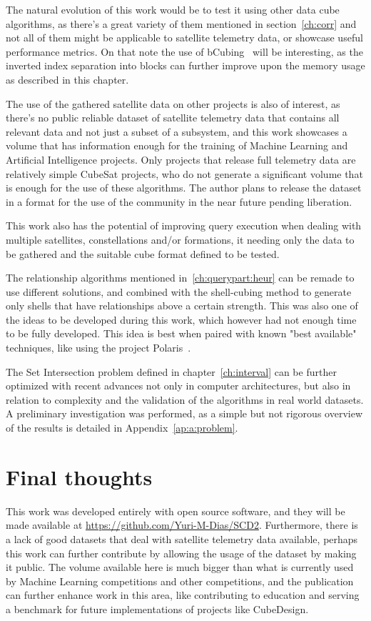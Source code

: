 The natural evolution of this work would be to test it using other data cube algorithms, as there's a great variety of them mentioned in section~\ref{ch:corr} and not all of them might be applicable to satellite telemetry data, or showcase useful performance metrics.
On that note the use of bCubing~\cite{silva:2015:abordagensParaCubo} will be interesting, as the inverted index separation into blocks can further improve upon the memory usage as described in this chapter.

The use of the gathered satellite data on other projects is also of interest, as there's no public reliable dataset of satellite telemetry data that contains all relevant data and not just a subset of a subsystem, and this work showcases a volume that has information enough for the training of Machine Learning and Artificial Intelligence projects.
Only projects that release full telemetry data are relatively simple CubeSat projects, who do not generate a significant volume that is enough for the use of these algorithms.
The author plans to release the dataset in a format for the use of the community in the near future pending liberation.

This work also has the potential of improving query execution when dealing with multiple satellites, constellations and/or formations, it needing only the data to be gathered and the suitable cube format defined to be tested.

The relationship algorithms mentioned in~\autoref{ch:querypart:heur} can be remade to use different solutions, and combined with the shell-cubing method to generate only shells that have relationships above a certain strength.
This was also one of the ideas to be developed during this work, which however had not enough time to be fully developed.
This idea is best when paired with known "best available" techniques, like using the project Polaris~.

The Set Intersection problem defined in chapter~\ref{ch:interval} can be further optimized with recent advances not only in computer architectures, but also in relation to complexity and the validation of the algorithms in real world datasets.
A preliminary investigation was performed, as a simple but not rigorous overview of the results is detailed in Appendix~\ref{ap:a:problem}.

\section{Final thoughts}\label{ch:concl:final}

This work was developed entirely with open source software, and they will be made available at \url{https://github.com/Yuri-M-Dias/SCD2}.
Furthermore, there is a lack of good datasets that deal with satellite telemetry data available, perhaps this work can further contribute by allowing the usage of the dataset by making it public.
The volume available here is much bigger than what is currently used by Machine Learning competitions and other competitions, and the publication can further enhance work in this area, like contributing to education and serving a benchmark for future implementations of projects like CubeDesign.

